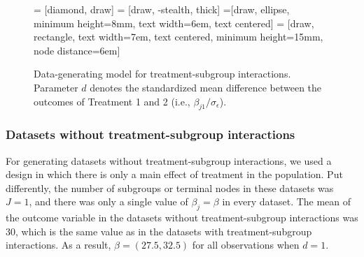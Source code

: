 \documentclass[nobf,doc]{apa}
\begin{document}
\begin{figure}[!h]
     = [diamond, draw]
     = [draw, -stealth, thick]
    =[draw, ellipse, minimum height=8mm, text width=6em, text centered]
    = [draw, rectangle, text width=7em, text centered, minimum height=15mm, node distance=6em]
	\caption{Data-generating model for treatment-subgroup interactions. Parameter $d$ denotes the standardized mean difference between the outcomes of Treatment 1 and 2 (i.e., $\beta_{j1} / \sigma_{\epsilon}$).}
	\label{fig:modelC}
\end{figure}


\subsubsection{Datasets without treatment-subgroup interactions}
For generating datasets without treatment-subgroup interactions, we used a design in which there is only a main effect of treatment in the population. Put differently, the number of subgroups or terminal nodes in these datasets was $J=1$, and there was only a single value of $\beta_j = \beta$ in every dataset. The mean of the outcome variable in the datasets without treatment-subgroup interactions was 30, which is the same value as in the datasets with treatment-subgroup interactions. As a result, $\beta = (27.5, 32.5)$ for all observations when $d=1$.
\end{document}
